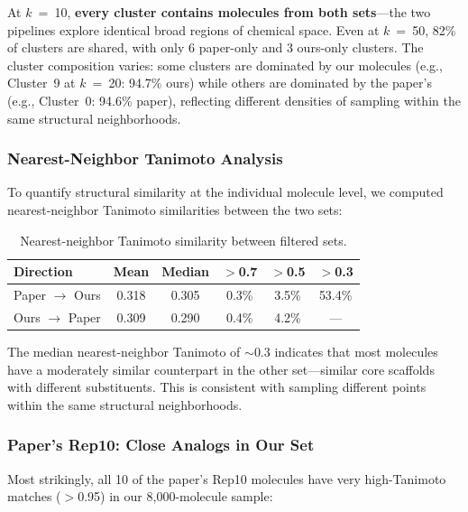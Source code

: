 \documentclass[11pt,a4paper]{article}
\begin{document}
At $k$~=~10, \textbf{every cluster contains molecules from both sets}---the two pipelines explore identical broad regions of chemical space. Even at $k$~=~50, 82\% of clusters are shared, with only 6 paper-only and 3 ours-only clusters. The cluster composition varies: some clusters are dominated by our molecules (e.g., Cluster~9 at $k$~=~20: 94.7\% ours) while others are dominated by the paper's (e.g., Cluster~0: 94.6\% paper), reflecting different densities of sampling within the same structural neighborhoods.

\subsubsection{Nearest-Neighbor Tanimoto Analysis}

To quantify structural similarity at the individual molecule level, we computed nearest-neighbor Tanimoto similarities between the two sets:

\begin{table}[H]
\centering
\caption{Nearest-neighbor Tanimoto similarity between filtered sets.}
\label{tab:nn_tanimoto}
\begin{tabular}{lccccc}
\toprule
Direction & Mean & Median & $>$0.7 & $>$0.5 & $>$0.3 \\
\midrule
Paper $\to$ Ours & 0.318 & 0.305 & 0.3\% & 3.5\% & 53.4\% \\
Ours $\to$ Paper & 0.309 & 0.290 & 0.4\% & 4.2\% & --- \\
\bottomrule
\end{tabular}
\end{table}

The median nearest-neighbor Tanimoto of $\sim$0.3 indicates that most molecules have a moderately similar counterpart in the other set---similar core scaffolds with different substituents. This is consistent with sampling different points within the same structural neighborhoods.

\subsubsection{Paper's Rep10: Close Analogs in Our Set}

Most strikingly, all 10 of the paper's Rep10 molecules have very high-Tanimoto matches ($>$0.95) in our 8,000-molecule sample:
\end{document}
